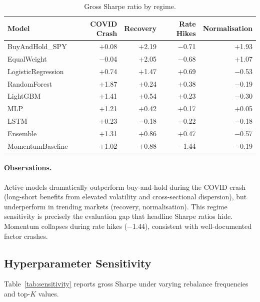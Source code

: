 \documentclass[11pt]{article}
\begin{document}
\begin{table}[H]
\centering
\caption{Gross Sharpe ratio by regime.}
\label{tab:regime}
\footnotesize
\begin{tabular}{l r r r r}
\toprule
Model & COVID Crash & Recovery & Rate Hikes & Normalisation \\
\midrule
BuyAndHold\_SPY       & $+$0.08   & $+$2.19  & $-$0.71 & $+$1.93 \\
EqualWeight           & $-$0.04   & $+$2.05  & $-$0.68 & $+$1.07 \\
LogisticRegression    & $+$0.74   & $+$1.47  & $+$0.69 & $-$0.53 \\
RandomForest          & $+$1.87   & $+$0.24  & $+$0.38 & $-$0.19 \\
LightGBM              & $+$1.41   & $+$0.54  & $+$0.23 & $-$0.30 \\
MLP                   & $+$1.21   & $+$0.42  & $+$0.17 & $+$0.05 \\
LSTM                  & $+$0.23   & $-$0.18  & $-$0.22 & $-$0.18 \\
Ensemble              & $+$1.31   & $+$0.86  & $+$0.47 & $-$0.57 \\
MomentumBaseline      & $+$1.02   & $+$0.88  & $-$1.44 & $-$0.19 \\
\bottomrule
\end{tabular}
\end{table}

\paragraph{Observations.}
Active models dramatically outperform buy-and-hold during the COVID crash (long-short benefits from elevated volatility and cross-sectional dispersion), but underperform in trending markets (recovery, normalisation).
This regime sensitivity is precisely the evaluation gap that headline Sharpe ratios hide.
Momentum collapses during rate hikes ($-$1.44), consistent with well-documented factor crashes.

\subsection{Hyperparameter Sensitivity}

Table~\ref{tab:sensitivity} reports gross Sharpe under varying rebalance frequencies and top-$K$ values.
\end{document}
